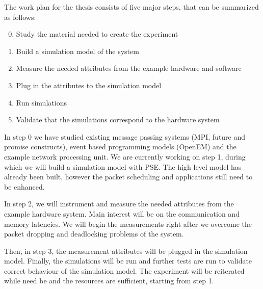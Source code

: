 The work plan for the thesis consists of five major steps, that can be summarized as follows:

\begin{enumerate}
\setcounter{enumi}{-1}
\item Study the material needed to create the experiment
\item Build a simulation model of the system
\item Measure the needed attributes from the example hardware and software
\item Plug in the attributes to the simulation model
\item Run simulations
\item Validate that the simulations correspond to the hardware system
\end{enumerate}

In step 0 we have studied existing message passing systems (MPI, future and promise constructs), event based programming models (OpenEM) and the example network processing unit. We are currently working on step 1, during which we will build a simulation model with PSE. The high level model has already been built, however the packet scheduling and applications still need to be enhanced.

In step 2, we will instrument and measure the needed attributes from the example hardware system. Main interest will be on the communication and memory latencies. We will begin the measurements right after we overcome the packet dropping and deadlocking problems of the system.

Then, in step 3, the measurement attributes will be plugged in the simulation model. Finally, the simulations will be run and further tests are run to validate correct behaviour of the simulation model. The experiment will be reiterated while need be and the resources are sufficient, starting from step 1.

